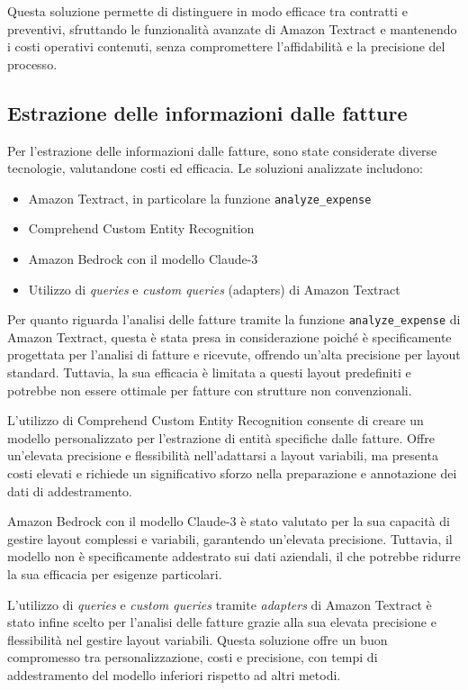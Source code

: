 Questa soluzione permette di distinguere in modo efficace tra contratti e preventivi, sfruttando le funzionalità avanzate di Amazon Textract e mantenendo i costi operativi contenuti, senza compromettere l'affidabilità e la precisione del processo.

\subsection{Estrazione delle informazioni dalle fatture}
\label{subsec:estrazione-fatture}
Per l'estrazione delle informazioni dalle fatture, sono state considerate diverse tecnologie, valutandone costi ed efficacia. Le soluzioni analizzate includono:

\begin{itemize}
    \item Amazon Textract, in particolare la funzione \texttt{analyze\_expense}
    \item Comprehend Custom Entity Recognition
    \item Amazon Bedrock con il modello Claude-3
    \item Utilizzo di \textit{queries} e \textit{custom queries} (adapters) di Amazon Textract
\end{itemize}

Per quanto riguarda l'analisi delle fatture tramite la funzione \texttt{analyze\_expense} di Amazon Textract, questa è stata presa in considerazione poiché è specificamente progettata per l'analisi di fatture e ricevute, offrendo un'alta precisione per layout standard. Tuttavia, la sua efficacia è limitata a questi layout predefiniti e potrebbe non essere ottimale per fatture con strutture non convenzionali.

L'utilizzo di Comprehend Custom Entity Recognition consente di creare un modello personalizzato per l'estrazione di entità specifiche dalle fatture. Offre un'elevata precisione e flessibilità nell'adattarsi a layout variabili, ma presenta costi elevati e richiede un significativo sforzo nella preparazione e annotazione dei dati di addestramento.

Amazon Bedrock con il modello Claude-3 è stato valutato per la sua capacità di gestire layout complessi e variabili, garantendo un'elevata precisione. Tuttavia, il modello non è specificamente addestrato sui dati aziendali, il che potrebbe ridurre la sua efficacia per esigenze particolari.

L'utilizzo di \textit{queries} e \textit{custom queries} tramite \textit{adapters} di Amazon Textract è stato infine scelto per l'analisi delle fatture grazie alla sua elevata precisione e flessibilità nel gestire layout variabili. Questa soluzione offre un buon compromesso tra personalizzazione, costi e precisione, con tempi di addestramento del modello inferiori rispetto ad altri metodi.


